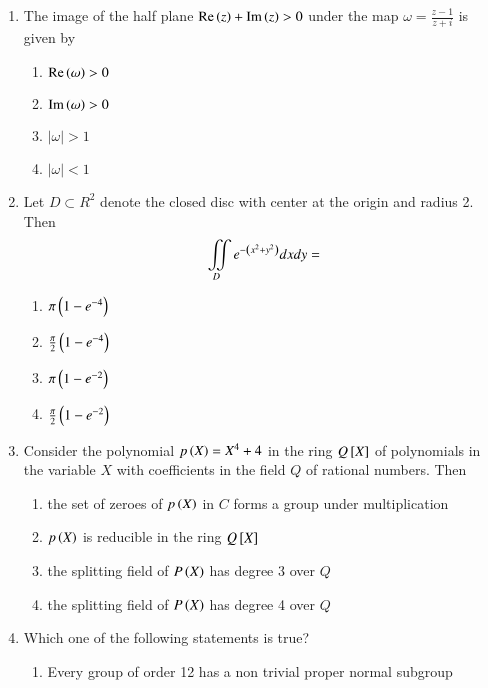 \documentclass[journal]{IEEEtran}
\begin{document}
\begin{enumerate}
\item  The image of the half plane $\operatorname{Re}\left(z\right)+\operatorname{Im}\left(z\right)>0$ under the map $\omega=\frac{z-1}{z+i}$ is given by 
\begin{multicols}{4}
\begin{enumerate}
    \item $\operatorname{Re}\left(\omega\right)>0$
    \item $\operatorname{Im}\left(\omega\right)>0$
    \item $|\omega|>1$
    \item $|\omega|<1$
\end{enumerate}
\end{multicols}
\item Let $D \subset R^2$ denote the closed disc with center at the origin and radius 2. Then
\begin{align*}
    \displaystyle \iint\limits_{D} e^{-\left(x^2+y^2\right)}dxdy=
\end{align*}
\begin{multicols}{4}
    \begin{enumerate}
        \item $\pi\left(1-e^{-4}\right)$
        \item $\frac{\pi}{2}\left(1-e^{-4}\right)$
        \item $\pi\left(1-e^{-2}\right)$
        \item $\frac{\pi}{2}\left(1-e^{-2}\right)$
    \end{enumerate}
\end{multicols}
\item Consider the polynomial $p\left(X\right)=X^4+4$ in the ring $Q{}\left[X\right]$ of polynomials in the variable $X$ with coefficients in the field $Q$ of rational numbers. Then
\begin{enumerate}
    \item the set of zeroes of $p\left(X\right)$ in $C$ forms a group under multiplication
    \item $p\left(X\right)$ is reducible in the ring $Q{}\left[X\right]$
    \item the splitting field of $P\left(X\right)$ has degree 3 over $Q$
    \item the splitting field of $P\left(X\right)$ has degree 4 over $Q$
\end{enumerate}
\item Which one of the following statements is true?
\begin{enumerate}
    \item Every group of order 12 has a non trivial proper normal subgroup 

\end{enumerate}
\end{enumerate}
\end{document}
